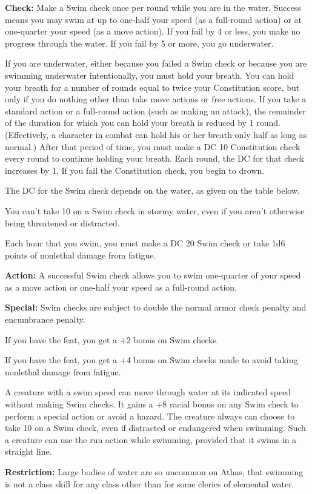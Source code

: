 \textbf{Check:} Make a Swim check once per round while you are in the water. Success means you may swim at up to one-half your speed (as a full-round action) or at one-quarter your speed (as a move action). If you fail by 4 or less, you make no progress through the water. If you fail by 5 or more, you go underwater.

If you are underwater, either because you failed a Swim check or because you are swimming underwater intentionally, you must hold your breath. You can hold your breath for a number of rounds equal to twice your Constitution score, but only if you do nothing other than take move actions or free actions. If you take a standard action or a full-round action (such as making an attack), the remainder of the duration for which you can hold your breath is reduced by 1 round. (Effectively, a character in combat can hold his or her breath only half as long as normal.) After that period of time, you must make a DC 10 Constitution check every round to continue holding your breath. Each round, the DC for that check increases by 1. If you fail the Constitution check, you begin to drown.

The DC for the Swim check depends on the water, as given on the table below.


You can't take 10 on a Swim check in stormy water, even if you aren't otherwise being threatened or distracted.

Each hour that you swim, you must make a DC 20 Swim check or take 1d6 points of nonlethal damage from fatigue.

\textbf{Action:} A successful Swim check allows you to swim one-quarter of your speed as a move action or one-half your speed as a full-round action.

\textbf{Special:} Swim checks are subject to double the normal armor check penalty and encumbrance penalty.

If you have the  feat, you get a +2 bonus on Swim checks.

If you have the  feat, you get a +4 bonus on Swim checks made to avoid taking nonlethal damage from fatigue.

A creature with a swim speed can move through water at its indicated speed without making Swim checks. It gains a +8 racial bonus on any Swim check to perform a special action or avoid a hazard. The creature always can choose to take 10 on a Swim check, even if distracted or endangered when swimming. Such a creature can use the run action while swimming, provided that it swims in a straight line.

\textbf{Restriction:} Large bodies of water are so uncommon on Athas, that swimming is not a class skill for any class other than for some clerics of elemental water.